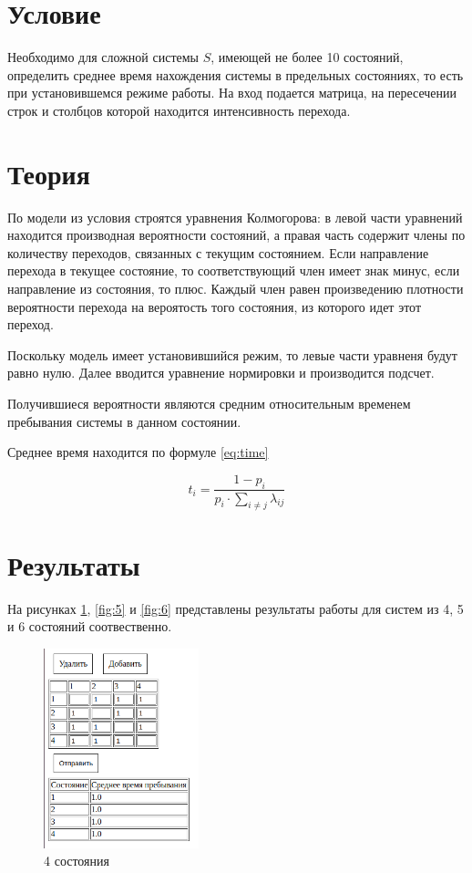 \section{Условие}

Необходимо для сложной системы $S$, имеющей не более 10 состояний, определить среднее время нахождения системы в предельных состояниях, то есть при установившемся режиме работы. На вход подается матрица, на пересечении строк и столбцов которой находится интенсивность перехода.

\section{Теория}

По модели из условия строятся уравнения Колмогорова: в левой части уравнений находится производная вероятности состояний, а правая часть содержит члены по количеству переходов, связанных с текущим состоянием. Если направление перехода в текущее состояние, то соответствующий член имеет знак минус, если направление из состояния, то плюс. Каждый член равен произведению плотности вероятности перехода на вероятость того состояния, из которого идет этот переход.

Поскольку модель имеет установившийся режим, то левые части уравненя будут равно нулю. Далее вводится уравнение нормировки и производится подсчет.

Получившиеся вероятности являются средним относительным временем пребывания системы в данном состоянии.

Среднее время находится по формуле \ref{eq:time}

\begin{equation}\label{eq:time}
    t_i = \frac{1 - p_i}{p_i \cdot \sum_{i \ne j}\lambda_{ij}}
\end{equation}

\section{Результаты}

На рисунках \ref{fig:4}, \ref{fig:5} и \ref{fig:6} представлены результаты работы для систем из 4, 5 и 6 состояний соотвественно.

\begin{figure}[H]
    \centering
    \includegraphics[width=0.4\textwidth]{img/content/4.png}
    \caption{4 состояния}
    \label{fig:4}
\end{figure}


